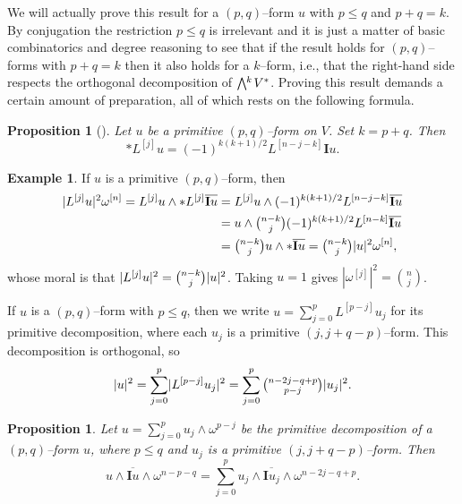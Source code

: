 \documentclass[11pt,a4paper]{amsart}
\def\^#1{^{[#1]}}
\def\bw#1{\bigwedge{}^{\mkern-5mu #1}\mkern2mu}
\def\I{\mathbf{I}}
\newtheorem{prop}[theo]{Proposition}
\theoremstyle{definition}
\newtheorem{exam}[theo]{Example}
\theoremstyle{remark}
\numberwithin{equation}{section}
\begin{document}
We will actually prove this result for a $(p,q)$--form $u$ with $p \leq q$
and $p+q = k$. By conjugation the restriction $p \leq q$ is irrelevant and
it is just a matter of basic combinatorics and degree reasoning to see
that if the result holds for $(p,q)$--forms with $p + q = k$ then it also
holds for a $k$--form, i.e., that the right-hand side respects the
orthogonal decomposition of $\bw{k}V^*$.  Proving this result demands a
certain amount of preparation, all of which rests on the following formula.


\begin{prop}[{{\cite[Proposition~1.67]{Huy}}}]
Let $u$ be a primitive $(p,q)$--form on $V$. Set $k = p+q$. Then
$$
    * L\^{j} u = (-1)^{k(k+1)/2} L\^{n-j-k} \I u.
$$
\end{prop}


\begin{exam}
If $u$ is a primitive $(p,q)$--form, then
\begin{align*}
\lvert L\^{j} u \rvert^2 \omega\^{n}
= L\^{j} u \wedge * L\^{j} \overline{\I u}
&= L\^{j} u \wedge (-1)^{k(k+1)/2} L\^{n-j-k} \overline{\I u} \\
&= u \wedge \tbinom{n-k}{j} (-1)^{k(k+1)/2} L\^{n-k} \overline{\I u} \\
&= \tbinom{n-k}{j} u \wedge * \overline{\I u}
= \tbinom{n-k}{j} \lvert u \rvert^2 \omega\^{n},
\end{align*}
whose moral is that $\lvert L\^{j} u \rvert^2 = \tbinom{n-k}{j} \lvert u
\rvert^2$. Taking $u = 1$ gives $|\omega\^{j}|^2 = \binom{n}{j}$.
\end{exam}


If $u$ is a $(p,q)$--form with $p \leq q$, then we write $u =
\sum_{j=0}^p L\^{p-j} u_j$ for its primitive decomposition, where each
$u_j$ is a primitive $(j,j+q-p)$--form. This decomposition is
orthogonal, so
$$
\lvert u \rvert^2
= \sum_{j=0}^p \lvert L\^{p-j} u_j \rvert^2
= \sum_{j=0}^p \tbinom{n-2j-q+p}{p-j} \lvert u_j \rvert^2.
$$


\begin{prop}
  \label{16}
  Let $u = \sum_{j=0}^p u_j \wedge \omega^{p-j}$ be the primitive
decomposition of a $(p,q)$--form $u$, where $p \leq q$ and $u_j$ is a
primitive $(j,j+q-p)$--form. Then
$$
u \wedge \overline{\I u} \wedge \omega^{n-p-q}
= \sum_{j=0}^p u_j \wedge \overline{\I u_j} \wedge \omega^{n-2j-q+p}.
$$
\end{prop}
\end{document}
